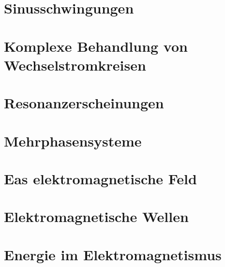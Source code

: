\documentclass[12pt,a4paper,twoside]{book}
\begin{document}

\chapter{Sinusschwingungen}


\chapter{Komplexe Behandlung von Wechselstromkreisen}


\chapter{Resonanzerscheinungen}


\chapter{Mehrphasensysteme}


\chapter{Eas elektromagnetische Feld}


\chapter{Elektromagnetische Wellen}


\chapter{Energie im Elektromagnetismus}
\end{document}
